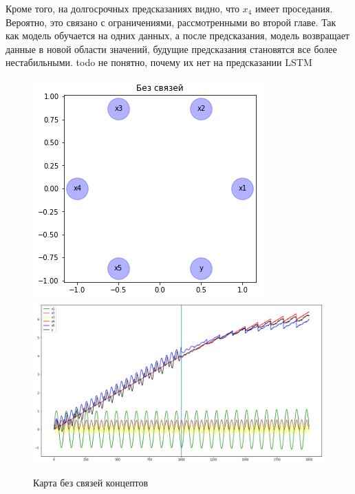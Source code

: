 Кроме того, на долгосрочных предсказаниях видно, что $ x_4 $ имеет проседания.
Вероятно, это связано с ограничениями, рассмотренными во второй главе.
Так как модель обучается на одних данных, а после предсказания, модель возвращает
данные в новой области значений, будущие предсказания становятся все более нестабильными.
todo не понятно, почему их нет на предсказании LSTM

\def\figurename{Рис}
\begin{figure}[t]
	\centering
	\includegraphics[width=0.7\columnwidth]{./img/lstmfcm_empty.png}
	\includegraphics[width=0.9\columnwidth]{./img/lstmfcm_empty_prediction.png}
	\caption{Карта без связей концептов}
	\label{img:lstmfcm_empty}
\end{figure}

